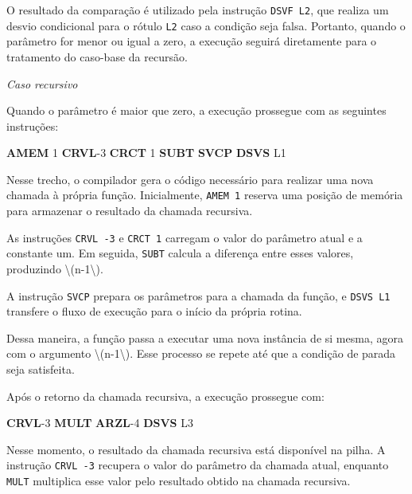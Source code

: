 \documentclass[
  brazilian,
  letterpaper,
]{book}
\newenvironment{Shaded}{\begin{snugshade}}{\end{snugshade}}
\newcommand{\DecValTok}[1]{\textcolor[rgb]{0.68,0.00,0.00}{#1}}
\newcommand{\FunctionTok}[1]{\textcolor[rgb]{0.28,0.35,0.67}{#1}}
\newcommand{\KeywordTok}[1]{\textcolor[rgb]{0.00,0.23,0.31}{\textbf{#1}}}
\newcommand{\NormalTok}[1]{\textcolor[rgb]{0.00,0.23,0.31}{#1}}
\theoremstyle{plain}
\theoremstyle{definition}
\theoremstyle{remark}
\begin{document}
O resultado da comparação é utilizado pela instrução \texttt{DSVF\ L2},
que realiza um desvio condicional para o rótulo \texttt{L2} caso a
condição seja falsa. Portanto, quando o parâmetro for menor ou igual a
zero, a execução seguirá diretamente para o tratamento do caso-base da
recursão.

\emph{Caso recursivo}

Quando o parâmetro é maior que zero, a execução prossegue com as
seguintes instruções:

\begin{Shaded}
\begin{Highlighting}[]
    \KeywordTok{AMEM}    \DecValTok{1}
    \KeywordTok{CRVL}\NormalTok{    {-}}\DecValTok{3}
    \KeywordTok{CRCT}    \DecValTok{1}
    \KeywordTok{SUBT}
    \KeywordTok{SVCP}
    \KeywordTok{DSVS}    \FunctionTok{L1}
\end{Highlighting}
\end{Shaded}

Nesse trecho, o compilador gera o código necessário para realizar uma
nova chamada à própria função. Inicialmente, \texttt{AMEM\ 1} reserva
uma posição de memória para armazenar o resultado da chamada recursiva.

As instruções \texttt{CRVL\ -3} e \texttt{CRCT\ 1} carregam o valor do
parâmetro atual e a constante um. Em seguida, \texttt{SUBT} calcula a
diferença entre esses valores, produzindo
\textbackslash(n-1\textbackslash).

A instrução \texttt{SVCP} prepara os parâmetros para a chamada da
função, e \texttt{DSVS\ L1} transfere o fluxo de execução para o início
da própria rotina.

Dessa maneira, a função passa a executar uma nova instância de si mesma,
agora com o argumento \textbackslash(n-1\textbackslash). Esse processo
se repete até que a condição de parada seja satisfeita.

Após o retorno da chamada recursiva, a execução prossegue com:

\begin{Shaded}
\begin{Highlighting}[]
    \KeywordTok{CRVL}\NormalTok{    {-}}\DecValTok{3}
    \KeywordTok{MULT}
    \KeywordTok{ARZL}\NormalTok{    {-}}\DecValTok{4}
    \KeywordTok{DSVS}    \FunctionTok{L3}
\end{Highlighting}
\end{Shaded}

Nesse momento, o resultado da chamada recursiva está disponível na
pilha. A instrução \texttt{CRVL\ -3} recupera o valor do parâmetro da
chamada atual, enquanto \texttt{MULT} multiplica esse valor pelo
resultado obtido na chamada recursiva.
\end{document}
